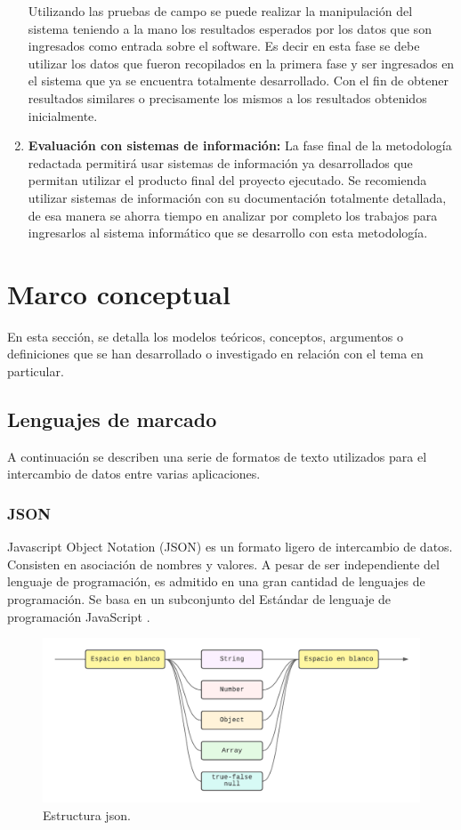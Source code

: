 \begin{enumerate}
	Utilizando las pruebas de campo se puede realizar la manipulación del sistema teniendo a la mano los resultados esperados por los datos que son ingresados como entrada sobre el software. Es decir en esta fase se debe utilizar los datos que fueron recopilados en la primera fase y ser ingresados en el sistema que ya se encuentra totalmente desarrollado. Con el fin de obtener resultados similares o precisamente los mismos a los resultados obtenidos inicialmente.
	
	\item \textbf{Evaluación con sistemas de información:} La fase final de la metodología redactada permitirá usar sistemas de información ya desarrollados que permitan utilizar el producto final del proyecto ejecutado. Se recomienda utilizar sistemas de información con su documentación totalmente detallada, de esa manera se ahorra tiempo en analizar por completo los trabajos para ingresarlos al sistema informático que se desarrollo con esta metodología.
	
	
\end{enumerate}

\section{Marco conceptual}

En esta sección, se detalla los modelos teóricos, conceptos, argumentos o definiciones que se han desarrollado o investigado en relación con el tema en particular.


\subsection{Lenguajes de marcado}	

A continuación se describen una serie de formatos de texto utilizados para el intercambio de datos entre varias aplicaciones.

\subsubsection{JSON}

Javascript Object Notation (JSON) es un formato ligero de intercambio de datos. Consisten en asociación de nombres y valores. A pesar de ser independiente del lenguaje de programación, es admitido en una gran cantidad de lenguajes de programación. Se basa en un subconjunto del Estándar de lenguaje de programación JavaScript \cite{JSON}.

\begin{figure}[h!]
	\centering
	\includegraphics[width=12cm]{img/json.png}
	\caption{Estructura json.}
	\label{fig:json}
\end{figure}

